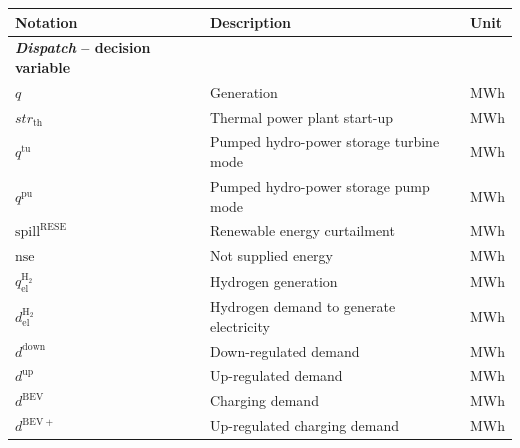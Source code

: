 \documentclass[final,10pt]{elsarticle}
\begin{document}
\begin{table}[H]
\begin{tabular}{lll}
\textbf{Notation}                              & \textbf{Description}                                   & \textbf{Unit}              \\ \hline



\textbf{\textit{Dispatch} – decision variable} &                                                        &                            \\
$q$                                            & Generation                                             & MWh                        \\
$str_{\mathrm{th}}$                                     & Thermal power plant start-up                           & MWh                        \\
$q^{\mathrm{tu}}$                                       & Pumped hydro-power storage turbine mode                & MWh                        \\
$q^{\mathrm{pu}}$                                       & Pumped hydro-power storage pump mode                   & MWh                        \\
$ \mathrm{spill}^{\mathrm{RESE}}$              & Renewable energy curtailment                           & MWh                        \\
$\mathrm{nse}$                                 & Not supplied energy                                    & MWh                        \\
$q^{\mathrm{H_2}}_\mathrm{el}$                 & Hydrogen generation                                    & MWh                        \\
$d^{\mathrm{H_2}}_\mathrm{el}$                 & Hydrogen demand to generate electricity                & MWh                        \\
$d^{\mathrm{down}}$                                     & Down-regulated demand                                  & MWh                        \\
$d^{\mathrm{up}}$                                       & Up-regulated demand                                    & MWh                        \\
$d^{\mathrm{BEV}}$                                       & Charging demand                           & MWh                        \\
$d^{\mathrm{BEV+}}$                                       & Up-regulated charging demand                           & MWh                        \\

\end{tabular}
\end{table}
\end{document}
